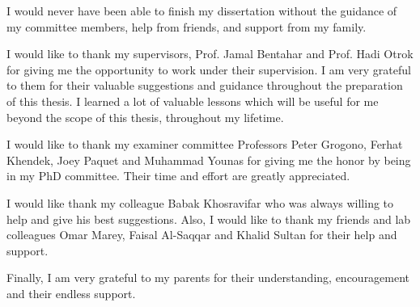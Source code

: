 I would never have been able to finish my dissertation without the guidance of my committee members, help from friends, and support from my family.

I would like to thank my supervisors, Prof. Jamal Bentahar and Prof. Hadi Otrok for giving me the opportunity to work under their supervision. I am very grateful to them for their valuable suggestions and guidance throughout the preparation of this thesis. I learned a lot of valuable lessons which will be useful for me beyond the scope of this thesis, throughout my lifetime.

I would like to thank my examiner committee Professors Peter Grogono, Ferhat Khendek, Joey Paquet and Muhammad Younas for giving me the honor by being in my PhD committee. Their time and effort are greatly appreciated.

I would like thank my colleague Babak Khosravifar who was always willing to help and give his best suggestions. Also, I would like to thank my friends and lab colleagues Omar Marey, Faisal Al-Saqqar and Khalid Sultan for their help and support.

Finally, I am very grateful to my parents for their understanding, encouragement and their endless support.
